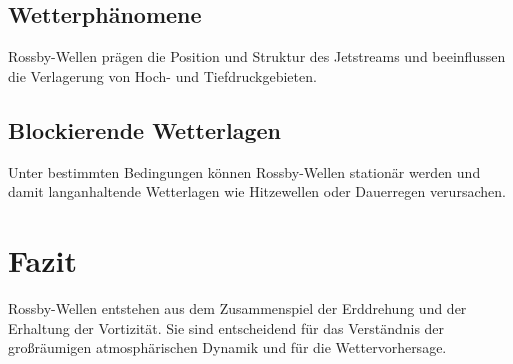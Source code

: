 \begin{refsection}
\subsection{Wetterphänomene}
Rossby-Wellen prägen die Position und Struktur des Jetstreams und beeinflussen die Verlagerung von Hoch- und Tiefdruckgebieten.

\subsection{Blockierende Wetterlagen}
Unter bestimmten Bedingungen können Rossby-Wellen stationär werden und damit langanhaltende Wetterlagen wie Hitzewellen oder Dauerregen verursachen.

\section{Fazit}
Rossby-Wellen entstehen aus dem Zusammenspiel der Erddrehung und der Erhaltung der Vortizität. Sie sind entscheidend für das Verständnis der großräumigen atmosphärischen Dynamik und für die Wettervorhersage.


\printbibliography[heading=subbibliography]
\end{refsection}
